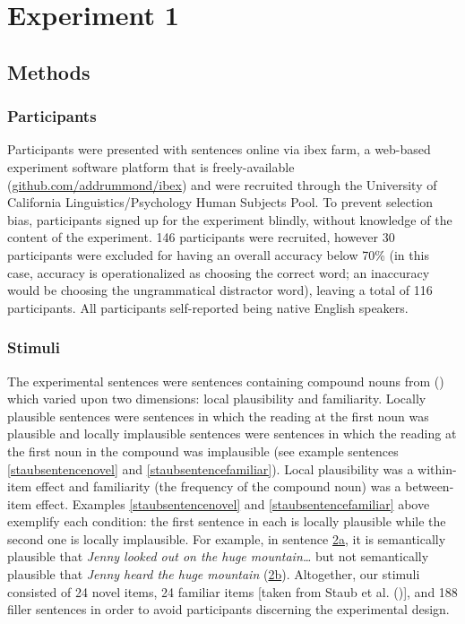 \documentclass[
  12pt,
  letterpaper,
]{scrreprt}
\begin{document}
\section{Experiment 1}\label{experiment-1}

\subsection{Methods}\label{methods}

\subsubsection{Participants}\label{participants}

Participants were presented with sentences online via ibex farm, a
web-based experiment software platform that is freely-available
(\url{github.com/addrummond/ibex}) and were recruited through the
University of California Linguistics/Psychology Human Subjects Pool. To
prevent selection bias, participants signed up for the experiment
blindly, without knowledge of the content of the experiment. 146
participants were recruited, however 30 participants were excluded for
having an overall accuracy below 70\% (in this case, accuracy is
operationalized as choosing the correct word; an inaccuracy would be
choosing the ungrammatical distractor word), leaving a total of 116
participants. All participants self-reported being native English
speakers.

\subsubsection{Stimuli}\label{stimuli}

The experimental sentences were sentences containing compound nouns from
()
which varied upon two dimensions: local plausibility and familiarity.
Locally plausible sentences were sentences in which the reading at the
first noun was plausible and locally implausible sentences were
sentences in which the reading at the first noun in the compound was
implausible (see example sentences \ref{staubsentencenovel} and
\ref{staubsentencefamiliar}). Local plausibility was a within-item
effect and familiarity (the frequency of the compound noun) was a
between-item effect. Examples \ref{staubsentencenovel} and
\ref{staubsentencefamiliar} above exemplify each condition: the first
sentence in each is locally plausible while the second one is locally
implausible. For example, in sentence
\hyperref[staubsentencefamiliar]{2a}, it is semantically plausible that
\emph{Jenny looked out on the huge mountain\ldots{}} but not
semantically plausible that \emph{Jenny heard the huge mountain}
(\hyperref[staubsentencefamiliar]{2b}). Altogether, our stimuli
consisted of 24 novel items, 24 familiar items {[}taken from Staub et
al. (){]}, and 188
filler sentences in order to avoid participants discerning the
experimental design.
\end{document}
